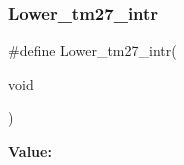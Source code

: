 \subsubsection{\texorpdfstring{Lower\_tm27\_intr}{Lower\_tm27\_intr}}
{\footnotesize\ttfamily \#define Lower\+\_\+tm27\+\_\+intr(\begin{DoxyParamCaption}\item[{}]{void }\end{DoxyParamCaption})}

{\bfseries Value\+:}
\begin{DoxyCode}{0}
\DoxyCodeLine{\textcolor{keywordflow}{do} \{ \(\backslash\)}
\DoxyCodeLine{    ; \(\backslash\)}

\end{DoxyCode}
